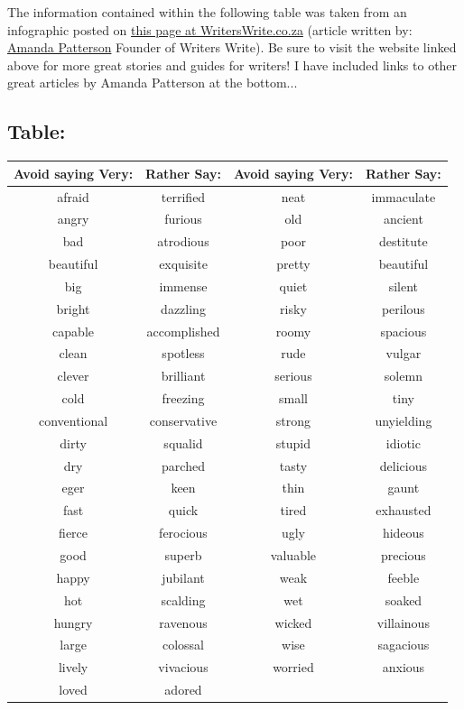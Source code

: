 \documentclass[openleft,oneside,showtrims]{memoir}
\begin{document}
The information contained within the following table was taken from an infographic posted on \href{https://www.writerswrite.co.za/45-ways-to-avoid-using-the-word-very/}{this page at WritersWrite.co.za} (article written by: \href{https://www.writerswrite.co.za/amanda-patterson/}{Amanda Patterson} Founder of Writers Write). Be sure to visit the website linked above for more great stories and guides for writers! I have included links to other great articles by Amanda Patterson at the bottom...

\subsection{Table:}
\label{sec:orgef7eb5d}

\begin{center}
\begin{tabular}{cccc}
\hline
Avoid saying Very: & Rather Say: & Avoid saying Very: & Rather Say:\\
\hline
afraid & terrified & neat & immaculate\\
\hline
angry & furious & old & ancient\\
\hline
bad & atrodious & poor & destitute\\
\hline
beautiful & exquisite & pretty & beautiful\\
\hline
big & immense & quiet & silent\\
\hline
bright & dazzling & risky & perilous\\
\hline
capable & accomplished & roomy & spacious\\
\hline
clean & spotless & rude & vulgar\\
\hline
clever & brilliant & serious & solemn\\
\hline
cold & freezing & small & tiny\\
\hline
conventional & conservative & strong & unyielding\\
\hline
dirty & squalid & stupid & idiotic\\
\hline
dry & parched & tasty & delicious\\
\hline
eger & keen & thin & gaunt\\
\hline
fast & quick & tired & exhausted\\
\hline
fierce & ferocious & ugly & hideous\\
\hline
good & superb & valuable & precious\\
\hline
happy & jubilant & weak & feeble\\
\hline
hot & scalding & wet & soaked\\
\hline
hungry & ravenous & wicked & villainous\\
\hline
large & colossal & wise & sagacious\\
\hline
lively & vivacious & worried & anxious\\
\hline
loved & adored &  & \\
\hline
\end{tabular}
\end{center}
\end{document}
